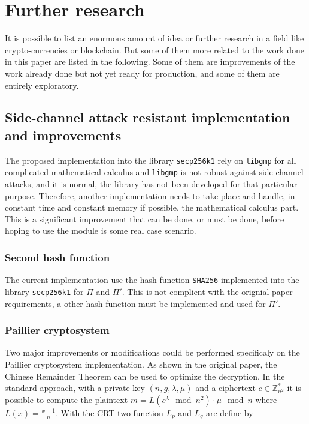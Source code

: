 \chapter{Further research}
\label{chap:furtherResearch}

It is possible to list an enormous amount of idea or further research in a field
like crypto-currencies or blockchain. But some of them more related to the work
done in this paper are listed in the following. Some of them are improvements of
the work already done but not yet ready for production, and some of them are
entirely exploratory.

\section{Side-channel attack resistant implementation and improvements}

The proposed implementation into the library \texttt{secp256k1} rely on
\texttt{libgmp} for all complicated mathematical calculus and \texttt{libgmp} is
not robust against side-channel attacks, and it is normal, the library has not
been developed for that particular purpose. Therefore, another implementation
needs to take place and handle, in constant time and constant memory if
possible, the mathematical calculus part. This is a significant improvement that
can be done, or must be done, before hoping to use the module is some real case
scenario.

\subsection{Second hash function}

The current implementation use the hash function \texttt{SHA256} implemented
into the library \texttt{secp256k1} for $\Pi$ and $\Pi'$. This is not complient
with the orignial paper requirements, a other hash function must be implemented
and used for $\Pi'$.

\subsection{Paillier cryptosystem}

Two major improvements or modifications could be performed specificaly on the
Paillier cryptosystem implementation. As shown in the original paper, the
Chinese Remainder Theorem can be used to optimize the decryption. In the
standard approach, with a private key $(n, g, \lambda, \mu)$ and a ciphertext $c
\in \mathbb{Z}_{n^2}^*$ it is possible to compute the plaintext $m =
L(c^{\lambda} \mod n^2) \cdot \mu \mod n$ where $L(x) = \frac{x-1}{n}$. With the
CRT two function $L_p$ and $L_q$ are define by

